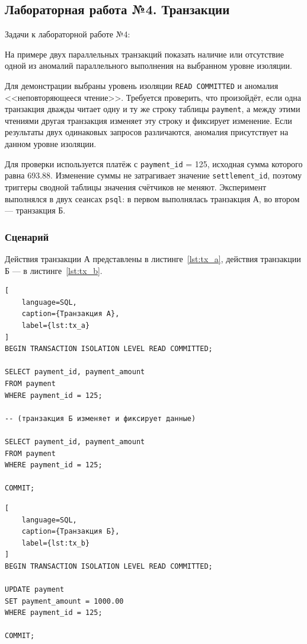 \newpage
\subsection{Лабораторная работа №4. Транзакции}
Задачи к лабораторной работе №4:

На примере двух параллельных транзакций показать наличие или отсутствие одной из аномалий параллельного выполнения на выбранном уровне изоляции.

Для демонстрации выбраны уровень изоляции \texttt{READ COMMITTED} и аномалия <<неповторяющееся чтение>>. Требуется проверить, что произойдёт, если одна транзакция дважды читает одну и ту же строку таблицы \texttt{payment}, а между этими чтениями другая транзакция изменяет эту строку и фиксирует изменение. Если результаты двух одинаковых запросов различаются, аномалия присутствует на данном уровне изоляции.

Для проверки используется платёж с \texttt{payment\_id} = 125, исходная сумма которого равна 693.88. Изменение суммы не затрагивает значение \texttt{settlement\_id}, поэтому триггеры сводной таблицы значения счётчиков не меняют. Эксперимент выполнялся в двух сеансах \texttt{psql}: в первом выполнялась транзакция А, во втором --- транзакция Б.

\subsubsection{Сценарий}

Действия транзакции А представлены в листинге~\ref{lst:tx_a}, действия транзакции Б --- в листинге~\ref{lst:tx_b}.

\begin{lstlisting}[
    language=SQL,
    caption={Транзакция А},
    label={lst:tx_a}
]
BEGIN TRANSACTION ISOLATION LEVEL READ COMMITTED;

SELECT payment_id, payment_amount
FROM payment
WHERE payment_id = 125;

-- (транзакция Б изменяет и фиксирует данные)

SELECT payment_id, payment_amount
FROM payment
WHERE payment_id = 125;

COMMIT;
\end{lstlisting}

\begin{lstlisting}[
    language=SQL,
    caption={Транзакция Б},
    label={lst:tx_b}
]
BEGIN TRANSACTION ISOLATION LEVEL READ COMMITTED;

UPDATE payment
SET payment_amount = 1000.00
WHERE payment_id = 125;

COMMIT;
\end{lstlisting}


